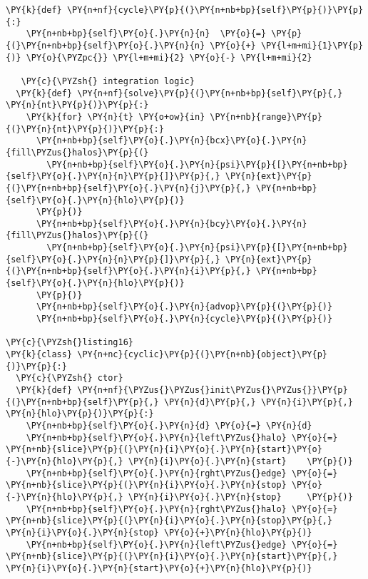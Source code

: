 \begin{Verbatim}[commandchars=\\\{\}]
  \PY{k}{def} \PY{n+nf}{cycle}\PY{p}{(}\PY{n+nb+bp}{self}\PY{p}{)}\PY{p}{:}
    \PY{n+nb+bp}{self}\PY{o}{.}\PY{n}{n}  \PY{o}{=} \PY{p}{(}\PY{n+nb+bp}{self}\PY{o}{.}\PY{n}{n} \PY{o}{+} \PY{l+m+mi}{1}\PY{p}{)} \PY{o}{\PYZpc{}} \PY{l+m+mi}{2} \PY{o}{-} \PY{l+m+mi}{2}

   \PY{c}{\PYZsh{} integration logic}
  \PY{k}{def} \PY{n+nf}{solve}\PY{p}{(}\PY{n+nb+bp}{self}\PY{p}{,} \PY{n}{nt}\PY{p}{)}\PY{p}{:}
    \PY{k}{for} \PY{n}{t} \PY{o+ow}{in} \PY{n+nb}{range}\PY{p}{(}\PY{n}{nt}\PY{p}{)}\PY{p}{:}
      \PY{n+nb+bp}{self}\PY{o}{.}\PY{n}{bcx}\PY{o}{.}\PY{n}{fill\PYZus{}halos}\PY{p}{(}
        \PY{n+nb+bp}{self}\PY{o}{.}\PY{n}{psi}\PY{p}{[}\PY{n+nb+bp}{self}\PY{o}{.}\PY{n}{n}\PY{p}{]}\PY{p}{,} \PY{n}{ext}\PY{p}{(}\PY{n+nb+bp}{self}\PY{o}{.}\PY{n}{j}\PY{p}{,} \PY{n+nb+bp}{self}\PY{o}{.}\PY{n}{hlo}\PY{p}{)}
      \PY{p}{)}
      \PY{n+nb+bp}{self}\PY{o}{.}\PY{n}{bcy}\PY{o}{.}\PY{n}{fill\PYZus{}halos}\PY{p}{(}
        \PY{n+nb+bp}{self}\PY{o}{.}\PY{n}{psi}\PY{p}{[}\PY{n+nb+bp}{self}\PY{o}{.}\PY{n}{n}\PY{p}{]}\PY{p}{,} \PY{n}{ext}\PY{p}{(}\PY{n+nb+bp}{self}\PY{o}{.}\PY{n}{i}\PY{p}{,} \PY{n+nb+bp}{self}\PY{o}{.}\PY{n}{hlo}\PY{p}{)}
      \PY{p}{)}
      \PY{n+nb+bp}{self}\PY{o}{.}\PY{n}{advop}\PY{p}{(}\PY{p}{)} 
      \PY{n+nb+bp}{self}\PY{o}{.}\PY{n}{cycle}\PY{p}{(}\PY{p}{)}
  
\PY{c}{\PYZsh{}listing16}
\PY{k}{class} \PY{n+nc}{cyclic}\PY{p}{(}\PY{n+nb}{object}\PY{p}{)}\PY{p}{:}
  \PY{c}{\PYZsh{} ctor}
  \PY{k}{def} \PY{n+nf}{\PYZus{}\PYZus{}init\PYZus{}\PYZus{}}\PY{p}{(}\PY{n+nb+bp}{self}\PY{p}{,} \PY{n}{d}\PY{p}{,} \PY{n}{i}\PY{p}{,} \PY{n}{hlo}\PY{p}{)}\PY{p}{:} 
    \PY{n+nb+bp}{self}\PY{o}{.}\PY{n}{d} \PY{o}{=} \PY{n}{d}
    \PY{n+nb+bp}{self}\PY{o}{.}\PY{n}{left\PYZus{}halo} \PY{o}{=} \PY{n+nb}{slice}\PY{p}{(}\PY{n}{i}\PY{o}{.}\PY{n}{start}\PY{o}{-}\PY{n}{hlo}\PY{p}{,} \PY{n}{i}\PY{o}{.}\PY{n}{start}    \PY{p}{)}
    \PY{n+nb+bp}{self}\PY{o}{.}\PY{n}{rght\PYZus{}edge} \PY{o}{=} \PY{n+nb}{slice}\PY{p}{(}\PY{n}{i}\PY{o}{.}\PY{n}{stop} \PY{o}{-}\PY{n}{hlo}\PY{p}{,} \PY{n}{i}\PY{o}{.}\PY{n}{stop}     \PY{p}{)}
    \PY{n+nb+bp}{self}\PY{o}{.}\PY{n}{rght\PYZus{}halo} \PY{o}{=} \PY{n+nb}{slice}\PY{p}{(}\PY{n}{i}\PY{o}{.}\PY{n}{stop}\PY{p}{,}      \PY{n}{i}\PY{o}{.}\PY{n}{stop} \PY{o}{+}\PY{n}{hlo}\PY{p}{)}
    \PY{n+nb+bp}{self}\PY{o}{.}\PY{n}{left\PYZus{}edge} \PY{o}{=} \PY{n+nb}{slice}\PY{p}{(}\PY{n}{i}\PY{o}{.}\PY{n}{start}\PY{p}{,}     \PY{n}{i}\PY{o}{.}\PY{n}{start}\PY{o}{+}\PY{n}{hlo}\PY{p}{)}


\end{Verbatim}
